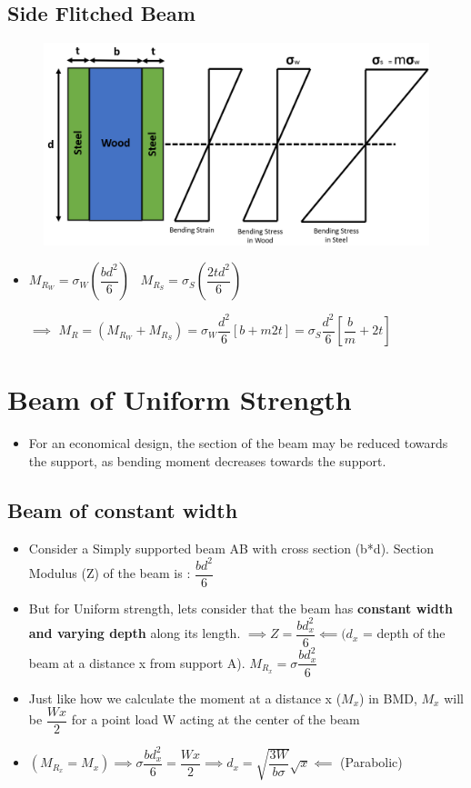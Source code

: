\documentclass[8pt]{report}
\begin{document}
	\subsection{Side Flitched Beam}
		\begin{figure}[H]
			\centering
			\includegraphics[scale=0.4]{sideflitchedbeam.png}
		\end{figure}
		\begin{itemize}
			\item $\boxed{M_{R_W} = \sigma_W\left(\dfrac{bd^2}{6}\right)}\;\;\;\boxed{M_{R_S} = \sigma_S\left(\dfrac{2td^2}{6}\right)}$
			\item[$\implies$] $\boxed{M_R  = (M_{R_W} + M_{R_S}) = \sigma_W\dfrac{d^2}{6}[b+m2t] = \sigma_S\dfrac{d^2}{6}[\dfrac{b}{m} + 2t]}$			
		\end{itemize}\hrulefill
	\section{Beam of Uniform Strength}
		\begin{itemize}
			\item For an economical design, the section of the beam may be reduced towards the support, as bending moment decreases towards the support.
		\end{itemize}
	\subsection{Beam of constant width}
		\begin{itemize}
			\item Consider a Simply supported beam AB with cross section (b*d). Section Modulus (Z) of the beam is : $\dfrac{bd^2}{6}$
			\item But for Uniform strength, lets consider that the beam has \textbf{constant width and varying depth} along its length. $\implies Z=\dfrac{bd_x^2}{6} \impliedby (d_x$ = depth of the beam at a distance x from support A). $M_{R_x} = \sigma\dfrac{bd_x^2}{6}$
			\item Just like how we calculate the moment at a distance x ($M_x$) in BMD, $M_x$ will be $\dfrac{Wx}{2}$ for a point load W acting at the center of the beam
			\item $(M_{R_x} = M_x) \implies \sigma\dfrac{bd_x^2}{6} = \dfrac{Wx}{2} \implies \boxed{d_x = \sqrt{\dfrac{3W}{b\sigma}}\sqrt{x}} \impliedby$ (Parabolic)
		\end{itemize}\hrulefill
\end{document}
